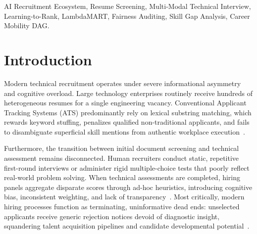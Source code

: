 \documentclass[conference]{IEEEtran}
\begin{document}
\begin{IEEEkeywords}
AI Recruitment Ecosystem, Resume Screening, Multi-Modal Technical Interview, Learning-to-Rank, LambdaMART, Fairness Auditing, Skill Gap Analysis, Career Mobility DAG.
\end{IEEEkeywords}

\section{Introduction}
Modern technical recruitment operates under severe informational asymmetry and cognitive overload. Large technology enterprises routinely receive hundreds of heterogeneous resumes for a single engineering vacancy. Conventional Applicant Tracking Systems (ATS) predominantly rely on lexical substring matching, which rewards keyword stuffing, penalizes qualified non-traditional applicants, and fails to disambiguate superficial skill mentions from authentic workplace execution~\cite{sackett2022revisiting}. 

Furthermore, the transition between initial document screening and technical assessment remains disconnected. Human recruiters conduct static, repetitive first-round interviews or administer rigid multiple-choice tests that poorly reflect real-world problem solving. When technical assessments are completed, hiring panels aggregate disparate scores through ad-hoc heuristics, introducing cognitive bias, inconsistent weighting, and lack of transparency~\cite{singh2018fairness}. Most critically, modern hiring processes function as terminating, uninformative dead ends: unselected applicants receive generic rejection notices devoid of diagnostic insight, squandering talent acquisition pipelines and candidate developmental potential~\cite{zhang2023job}.
\end{document}
